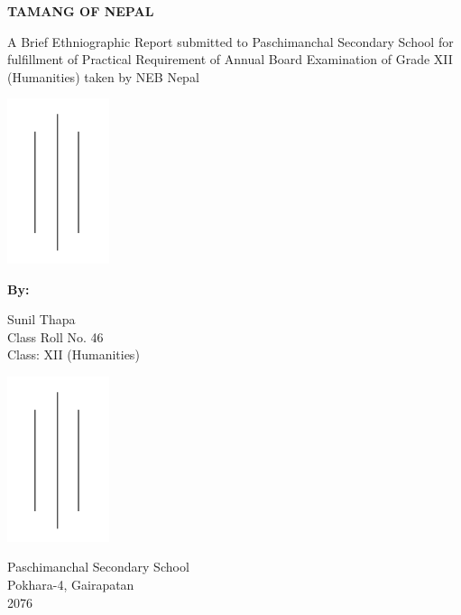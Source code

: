 \documentclass[a4paper,14pt]{article}
\begin{document}
\begin{titlepage}
	\centering
	{\bfseries\Large
		TAMANG OF NEPAL\\
		\vskip1cm


	}
	A Brief Ethniographic Report submitted to Paschimanchal Secondary School for fulfillment of Practical Requirement of Annual Board Examination of Grade XII (Humanities) taken by NEB Nepal


	\includegraphics[width=3cm]{sample.png}

	\textbf{By:}

	Sunil Thapa\\
	Class Roll No. 46 \\
	Class: XII (Humanities)


	\includegraphics[width=3cm]{sample.png}


	Paschimanchal Secondary School \\
	Pokhara-4, Gairapatan \\
	2076
\end{titlepage}
\end{document}
